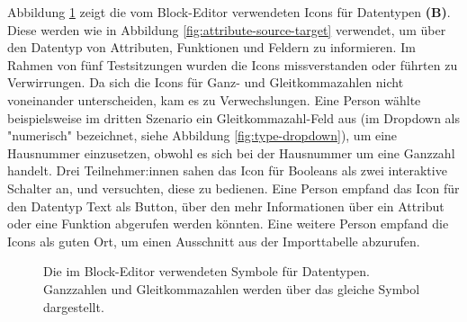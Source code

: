 \pskip
Abbildung \ref{fig:icons} zeigt die vom Block-Editor verwendeten Icons für Datentypen \textbf{(B)}. Diese werden wie in Abbildung \ref{fig:attribute-source-target} verwendet, um über den Datentyp von Attributen, Funktionen und Feldern zu informieren. Im Rahmen von fünf Testsitzungen wurden die Icons missverstanden oder führten zu Verwirrungen. Da sich die Icons für Ganz- und Gleitkommazahlen nicht voneinander unterscheiden, kam es zu Verwechslungen. Eine Person wählte beispielsweise im dritten Szenario ein Gleitkommazahl-Feld aus (im Dropdown als "numerisch" bezeichnet, siehe Abbildung \ref{fig:type-dropdown}), um eine Hausnummer einzusetzen, obwohl es sich bei der Hausnummer um eine Ganzzahl handelt.  Drei Teilnehmer:innen sahen das Icon für Booleans als zwei interaktive Schalter an, und versuchten, diese zu bedienen. Eine Person empfand das Icon für den Datentyp Text als Button, über den mehr Informationen über ein Attribut oder eine Funktion abgerufen werden könnten. Eine weitere Person empfand die Icons als guten Ort, um einen Ausschnitt aus der Importtabelle abzurufen.

\begin{figure}
  \centering
  \caption[Die im Block-Editor verwendeten Symbole für Datentypen]{Die im Block-Editor verwendeten Symbole für Datentypen. Ganzzahlen und Gleitkommazahlen werden über das gleiche Symbol dargestellt. \\}
  \label{fig:icons}
\end{figure}

